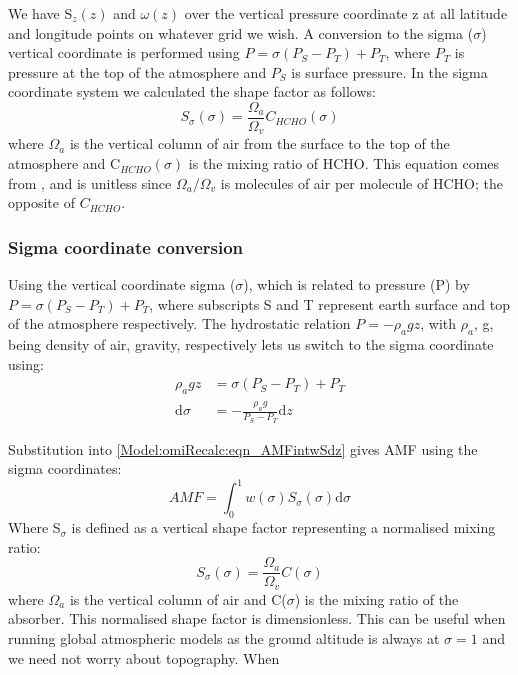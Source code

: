       
      We have S$_z(z)$ and $\omega(z)$ over the vertical pressure coordinate z at all latitude and longitude points on whatever grid we wish. 
      A conversion to the sigma ($\sigma$) vertical coordinate is performed using $ P = \sigma (P_S - P_T) + P_T$, where $P_T$ is pressure at the top of the atmosphere and $P_S$ is surface pressure.
      In the sigma coordinate system we calculated the shape factor as follows:
      \begin{equation} \label{Model:omiRecalc:eqn_ShapeFactorSigma}
      S_\sigma(\sigma) = \frac{\Omega_a}{\Omega_v}C_{HCHO}(\sigma)
      \end{equation}
      where $\Omega_a$ is the vertical column of air from the surface to the top of the atmosphere and C$_{HCHO}(\sigma)$ is the mixing ratio of HCHO.
      This equation comes from \citet{Palmer2001}, and is unitless since $\Omega_a / \Omega_v$ is molecules of air per molecule of HCHO; the opposite of $C_{HCHO}$.
    
    \subsubsection{Sigma coordinate conversion}
      \label{Model:omiRecalc:sigmacoord}
      
      Using the vertical coordinate sigma ($\sigma$), which is related to pressure (P) by $P=\sigma \left( P_S - P_T \right) + P_T$, where subscripts S and T represent earth surface and top of the atmosphere respectively.
      The hydrostatic relation $P = - \rho_a g z$, with $\rho_a$, g, being density of air, gravity, respectively lets us switch to the sigma coordinate using:
      \begin{align*}
        \rho_a g z & = \sigma \left( P_S - P_T \right) + P_T \\
        \mathrm{d}\sigma  & = - \frac{ \rho_a g }{ P_S - P_T } \mathrm{d}z
      \end{align*}
      
      Substitution into \ref{Model:omiRecalc:eqn_AMFintwSdz} gives AMF using the sigma coordinates:
      \begin{equation} \label{Model:omiRecalc:eqn_AMFintwSdsigma}
      AMF = \int_0^1 w(\sigma) S_\sigma(\sigma) \mathrm{d}\sigma
      \end{equation}
      Where S$_\sigma$ is defined as a vertical shape factor representing a normalised mixing ratio:
      \begin{equation}
      S_\sigma (\sigma) = \frac{\Omega_a}{\Omega_v}C(\sigma)
      \end{equation}
      where $\Omega_a$ is the vertical column of air and C($\sigma$) is the mixing ratio of the absorber.
      This normalised shape factor is dimensionless.
      This can be useful when running global atmospheric models as the ground altitude is always at $\sigma=1$ and we need not worry about topography.
      When 
    

